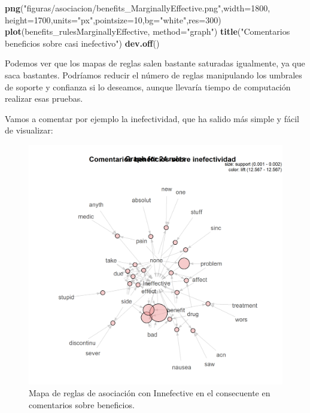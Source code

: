 \documentclass[spanish,]{article}
\newenvironment{Shaded}{\begin{snugshade}}{\end{snugshade}}
\newcommand{\KeywordTok}[1]{\textcolor[rgb]{0.13,0.29,0.53}{\textbf{#1}}}
\newcommand{\DataTypeTok}[1]{\textcolor[rgb]{0.13,0.29,0.53}{#1}}
\newcommand{\DecValTok}[1]{\textcolor[rgb]{0.00,0.00,0.81}{#1}}
\newcommand{\StringTok}[1]{\textcolor[rgb]{0.31,0.60,0.02}{#1}}
\newcommand{\NormalTok}[1]{#1}
\begin{document}
\begin{Shaded}
\begin{Highlighting}[]
\KeywordTok{png}\NormalTok{(}\StringTok{"figuras/asociacion/benefits_MarginallyEffective.png"}\NormalTok{,}\DataTypeTok{width=}\DecValTok{1800}\NormalTok{,}
    \DataTypeTok{height=}\DecValTok{1700}\NormalTok{,}\DataTypeTok{units=}\StringTok{"px"}\NormalTok{,}\DataTypeTok{pointsize=}\DecValTok{10}\NormalTok{,}\DataTypeTok{bg=}\StringTok{"white"}\NormalTok{,}\DataTypeTok{res=}\DecValTok{300}\NormalTok{)}
\KeywordTok{plot}\NormalTok{(benefits_rulesMarginallyEffective, }\DataTypeTok{method=}\StringTok{"graph"}\NormalTok{)}
\KeywordTok{title}\NormalTok{(}\StringTok{"Comentarios beneficios sobre casi inefectivo"}\NormalTok{)}
\KeywordTok{dev.off}\NormalTok{()}
\end{Highlighting}
\end{Shaded}

Podemos ver que los mapas de reglas salen bastante saturadas igualmente,
ya que saca bastantes. Podríamos reducir el número de reglas manipulando
los umbrales de soporte y confianza si lo deseamos, aunque llevaría
tiempo de computación realizar esas pruebas.

Vamos a comentar por ejemplo la inefectividad, que ha salido más simple
y fácil de visualizar:

\begin{figure}[h]
    \centering
    \includegraphics[width=1\textwidth]{figuras/asociacion/benefits_Innefective.png}
    \caption{Mapa de reglas de asociación con Innefective en el consecuente en comentarios sobre beneficios.}
    \label{fig:asociacion:innefectiveAsociacion}
\end{figure}
\end{document}
